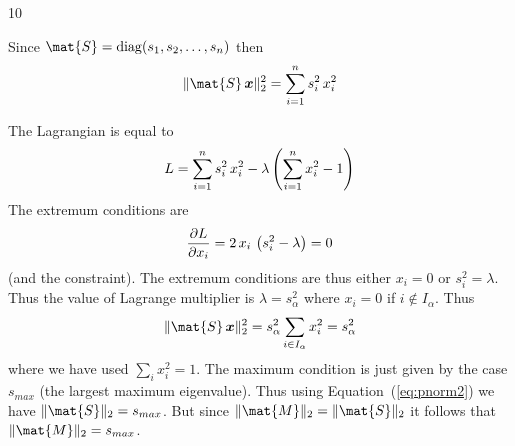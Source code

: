 \documentclass{sotonExamBoxes}    %
\begin{document}
\begin{question}{10}
\begin{qparts}
\begin{answer}
    \end{answer}
    \freshpage {}
    \begin{answer}
      Since $\mat{S}= \diag(s_1, s_2, \ldots, s_n)$ then
      \begin{align*}
        \len{\mat{S}\,\bm{x}}_2^2 = \sum_{i=1}^n s_i^2\,x_i^2
      \end{align*}
    \end{answer}
    \begin{answer}
      The Lagrangian is equal to
      \begin{align*}
        L = \sum_{i=1}^n s_i^2 \, x_i^2 - \lambda\left( \sum_{i=1}^n
        x_i^2 -1 \right)
      \end{align*}
      The extremum conditions are
      \begin{align*}
        \frac{\partial L}{\partial x_i} = 2\,x_i\,\left( s_i^2 - \lambda \right) = 0
      \end{align*}
      (and the constraint).  The extremum conditions are thus either
      $x_i=0$ or $s_i^2=\lambda$.   Thus the value of Lagrange
      multiplier is $\lambda = s_\alpha^2$ where $x_i=0$ if $i\not\in
      I_\alpha$.  Thus
      \begin{align*}
        \len{\mat{S}\,\bm{x}}_2^2 = s_\alpha^2 \sum_{i \in I_\alpha} x_i^2
        = s_\alpha^2
      \end{align*}
      where we have used $ \sum_{i} x_i^2=1$.  The maximum condition
      is just given by the case $s_{max}$ (the largest maximum
      eigenvalue).  Thus using Equation~(\ref{eq:pnorm2}) we have
      $\len{\mat{S}}_2= s_{max}$.  But since $\len{\mat{M}}_2 =
      \len{\mat{S}}_2$ it follows that $\len{\mat{M}}_2 = s_{max}$.
    \end{answer}
  \end{qparts}
\end{question}
\freshpage
\end{document}
